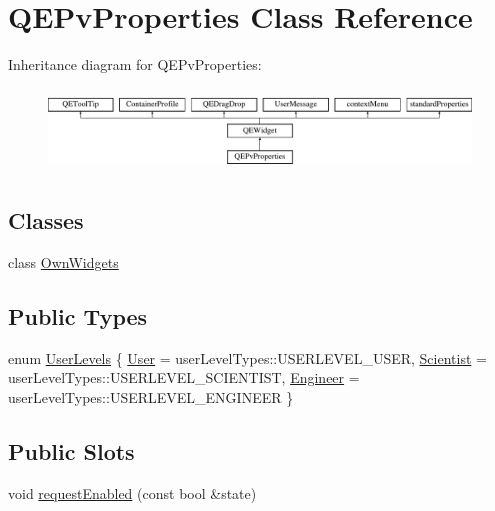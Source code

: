 \hypertarget{classQEPvProperties}{
\section{QEPvProperties Class Reference}
\label{classQEPvProperties}
}
Inheritance diagram for QEPvProperties:\begin{figure}[H]
\begin{center}
\leavevmode
\includegraphics[height=2.204725cm]{classQEPvProperties}
\end{center}
\end{figure}
\subsection*{Classes}
\begin{DoxyCompactItemize}
\item 
class \hyperlink{classQEPvProperties_1_1OwnWidgets}{OwnWidgets}
\end{DoxyCompactItemize}
\subsection*{Public Types}
\begin{DoxyCompactItemize}
\item 
enum \hyperlink{classQEPvProperties_affb354a03ed5e2905586fad96fd9cb32}{UserLevels} \{ \hyperlink{classQEPvProperties_affb354a03ed5e2905586fad96fd9cb32af0eaf8d5415a4af7f36933ca2649589c}{User} =  userLevelTypes::USERLEVEL\_\-USER, 
\hyperlink{classQEPvProperties_affb354a03ed5e2905586fad96fd9cb32ad3ac346d6d184fe430dd597cdb5878fa}{Scientist} =  userLevelTypes::USERLEVEL\_\-SCIENTIST, 
\hyperlink{classQEPvProperties_affb354a03ed5e2905586fad96fd9cb32a05ce75edc0221efb8d86aba47e4c09fb}{Engineer} =  userLevelTypes::USERLEVEL\_\-ENGINEER
 \}
\end{DoxyCompactItemize}
\subsection*{Public Slots}
\begin{DoxyCompactItemize}
\item 
void \hyperlink{classQEPvProperties_a8a89ebfcb2efc32f2d9948f9b3e06f02}{requestEnabled} (const bool \&state)
\end{DoxyCompactItemize}
